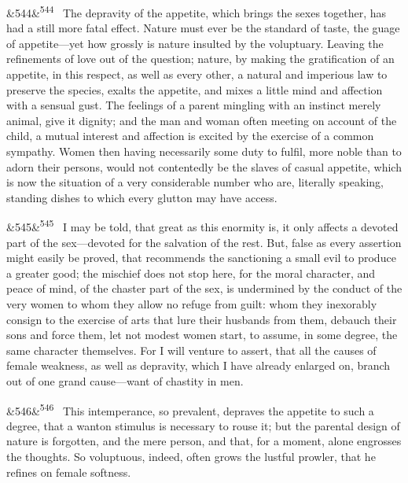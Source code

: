 \documentclass[12pt]{article}
\newcommand{\para}[1][]{\par\noindent\ifx&#1&\else\textsuperscript{\footnotesize #1}~\fi}
\begin{document}
\para[544] The depravity of the appetite, which brings the sexes together, has had a still more fatal effect. Nature must ever be the standard of taste, the guage of appetite---yet how grossly is nature insulted by the voluptuary. Leaving the refinements of love out of the question; nature, by making the gratification of an appetite, in this respect, as well as every other, a natural and imperious law to preserve the species, exalts the appetite, and mixes a little mind and affection with a sensual gust. The feelings of a parent mingling with an instinct merely animal, give it dignity; and the man and woman often meeting on account of the child, a mutual interest and affection is excited by the exercise of a common sympathy. Women then having necessarily some duty to fulfil, more noble than to adorn their persons, would not contentedly be the slaves of casual appetite, which is now the situation of a very considerable number who are, literally speaking, standing dishes to which every glutton may have access.

\para[545] I may be told, that great as this enormity is, it only affects a devoted part of the sex---devoted for the salvation of the rest. But, false as every assertion might easily be proved, that recommends the sanctioning a small evil to produce a greater good; the mischief does not stop here, for the moral character, and peace of mind, of the chaster part of the sex, is undermined by the conduct of the very women to whom they allow no refuge from guilt: whom they inexorably consign to the exercise of arts that lure their husbands from them, debauch their sons and force them, let not modest women start, to assume, in some degree, the same character themselves. For I will venture to assert, that all the causes of female weakness, as well as depravity, which I have already enlarged on, branch out of one grand cause---want of chastity in men.

\para[546] This intemperance, so prevalent, depraves the appetite to such a degree, that a wanton stimulus is necessary to rouse it; but the parental design of nature is forgotten, and the mere person, and that, for a moment, alone engrosses the thoughts. So voluptuous, indeed, often grows the lustful prowler, that he refines on female softness.
\end{document}
